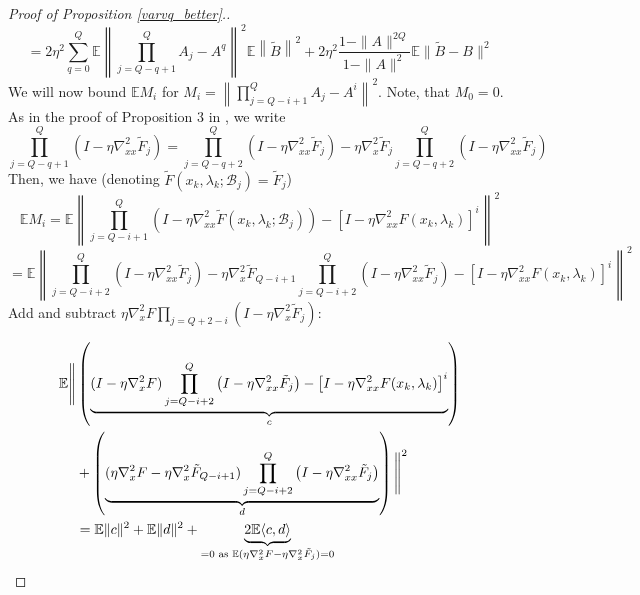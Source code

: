 \documentclass[11pt, twoside]{report}
\begin{document}
\begin{proof}[Proof of Proposition \ref{varvq_better}.]
\[= 2 \eta^2 \sum_{q=0}^{Q} \mathbb{E} \left\| \prod_{j = Q-q+1}^Q A_j - A^{q} \right \|^2 \mathbb{E} \left\| \tilde{B} \right\|^2 + 2\eta^2 \frac{1-\|A\|^{2Q}}{1-\|A\|^2} \mathbb{E} \|\tilde{B} - B\|^2\]
We will now bound $\mathbb{E}M_i$ for $M_i = \left\| \prod_{j = Q-i+1}^Q A_j - A^{i} \right \|^2$. Note, that $M_0 = 0.$ As in the proof of Proposition 3 in \cite{ji2021bilevel}, we write
    \[\prod_{j=Q-q + 1}^Q\left(I- \eta \nabla_{xx}^2 \tilde{F}_j\right) = \prod_{j=Q-q + 2}^Q \left(I- \eta \nabla_{xx}^2 \tilde{F}_j\right) - \eta \nabla_x^2 \tilde{F}_j\prod_{j=Q-q + 2}^Q\left(I- \eta \nabla_{xx}^2 \tilde{F}_j\right) \]
    Then, we have (denoting $\tilde{F}\left(x_k, \lambda_k ; \mathcal{B}_j\right) = \tilde{F}_j$)
    \[\mathbb{E} M_i = \mathbb{E} \left\| \prod_{j=Q-i+1}^Q\left(I- \eta \nabla_{xx}^2 \tilde{F}\left(x_k, \lambda_k ; \mathcal{B}_j\right)\right) -  \left[I - \eta\nabla_{xx}^2 F \left(x_k, \lambda_k\right)\right]^i \right\|^2\]
    \[ = \mathbb{E} \left\| \prod_{j=Q-i + 2}^Q \left(I- \eta \nabla_{xx}^2 \tilde{F}_j\right) - \eta \nabla_x^2 \tilde{F}_{Q-i+1}\prod_{j=Q-i + 2}^Q\left(I- \eta \nabla_{xx}^2 \tilde{F}_j\right) - \left[I - \eta\nabla_{xx}^2 F \left(x_k, \lambda_k\right)\right]^i \right\|^2\]
    Add and subtract $\eta \nabla_x^2 F \prod_{j = Q + 2 - i}(I - \eta \nabla_x^2 \tilde{F}_j)$:

    \begin{align}
    \mathbb{E} \Bigg\| 
    &\left( \underbrace{(I - \eta \nabla_x^2 F) 
    \prod_{j=Q - i + 2}^Q \left(I - \eta \nabla_{xx}^2 \tilde{F}_j\right) 
    - \left[I - \eta \nabla_{xx}^2 F(x_k, \lambda_k)\right]^i}_{c} \right) \notag \\
    &+ \left( \underbrace{
    (\eta \nabla_x^2 F - \eta \nabla_x^2 \tilde{F}_{Q - i + 1}) 
    \prod_{j=Q - i + 2}^Q \left(I - \eta \nabla_{xx}^2 \tilde{F}_j\right)
    }_{d} \right)
    \Bigg\|^2 \\
    &=\mathbb{E}\|c\|^2 + \mathbb{E}\|d\|^2 + \underbrace{2\mathbb{E}\langle c,d \rangle}_{=0 \text{ as } \mathbb{E}(\eta \nabla_x^2 F - \eta \nabla_x^2 \tilde{F}_j) = 0}
    \end{align}

\end{proof}
\end{document}
